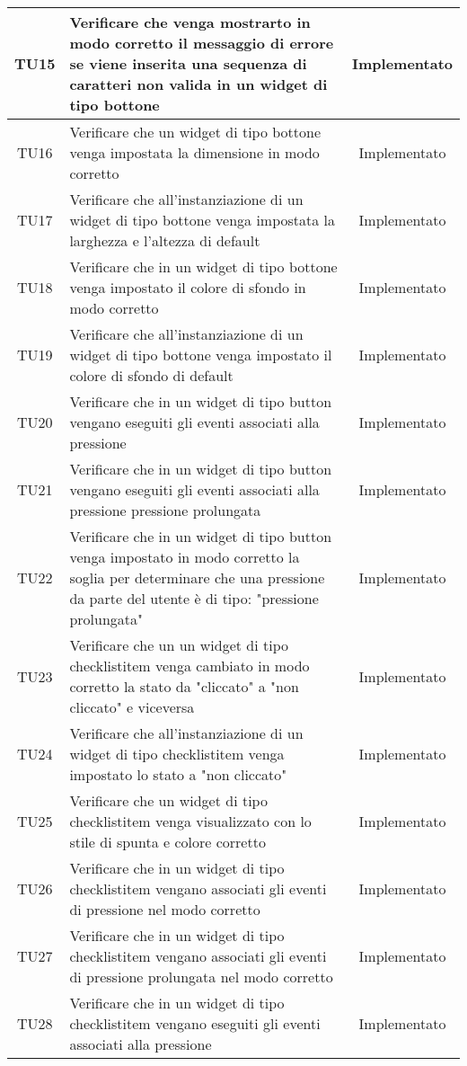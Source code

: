 \begin{center}
\begin{longtable}{|c|>{\centering}m{10cm}|c|}
		TU15 & Verificare che venga mostrarto in modo corretto il messaggio di errore se viene inserita una sequenza di caratteri non valida in un widget di tipo bottone & Implementato \\ \hline
		TU16 & Verificare che un widget di tipo bottone venga impostata la dimensione in modo corretto & Implementato \\ \hline
		TU17 & Verificare che all'instanziazione di un widget di tipo bottone venga impostata la larghezza e l'altezza di default & Implementato \\ \hline
		TU18 & Verificare che in un widget di tipo bottone venga impostato il colore di sfondo in modo corretto & Implementato \\ \hline
		TU19 & Verificare che all'instanziazione di un widget di tipo bottone venga impostato il colore di sfondo di default & Implementato \\ \hline
		TU20 & Verificare che in un widget di tipo button vengano eseguiti gli eventi associati alla pressione & Implementato \\ \hline
		TU21 & Verificare che in un widget di tipo button vengano eseguiti gli eventi associati alla pressione pressione prolungata & Implementato \\ \hline
		TU22 & Verificare che in un widget di tipo button venga impostato in modo corretto la soglia per determinare che una pressione da parte del utente è di tipo: "pressione prolungata" & Implementato \\ \hline
		TU23 & Verificare che un un widget di tipo checklistitem venga cambiato in modo corretto la stato da "cliccato" a "non cliccato" e viceversa & Implementato \\ \hline
		TU24 & Verificare che all'instanziazione di un widget di tipo checklistitem venga impostato lo stato a "non cliccato" & Implementato \\ \hline
		TU25 & Verificare che un widget di tipo checklistitem venga visualizzato con lo stile di spunta e colore corretto & Implementato \\ \hline
		TU26 & Verificare che in un widget di tipo checklistitem vengano associati gli eventi di pressione nel modo corretto & Implementato \\ \hline
		TU27 & Verificare che in un widget di tipo checklistitem vengano associati gli eventi di pressione prolungata nel modo corretto & Implementato \\ \hline
		TU28 & Verificare che in un widget di tipo checklistitem vengano eseguiti gli eventi associati alla pressione & Implementato \\ \hline

\end{longtable}
\end{center}
